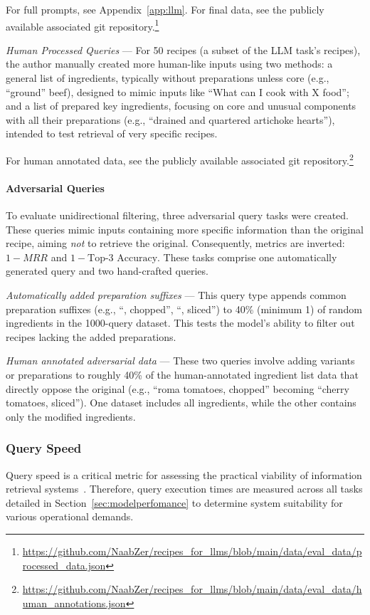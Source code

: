 \documentclass[11pt]{article}
\begin{document}
For full prompts, see Appendix~\ref{app:llm}. For final data, see the publicly
available associated git
repository.\footnote{\url{https://github.com/NaabZer/recipes_for_llms/blob/main/data/eval_data/processed_data.json}}

\emph{Human Processed Queries} --- For 50 recipes (a subset of the LLM task's
recipes), the author manually created more human-like inputs using two methods:
a general list of ingredients, typically without preparations unless core (e.g.,
``ground'' beef), designed to mimic inputs like ``What can I cook with X
food''; and a list of prepared key ingredients, focusing on core and unusual
components with all their preparations (e.g., ``drained and quartered artichoke
hearts''), intended to test retrieval of very specific recipes.

For human annotated data, see the publicly available associated git
repository.\footnote{\url{https://github.com/NaabZer/recipes_for_llms/blob/main/data/eval_data/human_annotations.json}} 

\paragraph{Adversarial Queries}
To evaluate unidirectional filtering, three adversarial query tasks were created.
These queries mimic inputs containing more specific information than the
original recipe, aiming \emph{not} to retrieve the original.
Consequently, metrics are inverted: $1-MRR$ and $1-\text{Top-3 Accuracy}$.
These tasks comprise one automatically generated query and two hand-crafted queries.

\emph{Automatically added preparation suffixes} --- This query type appends
common preparation suffixes (e.g., ``, chopped'', ``, sliced'') to 40\% (minimum
1) of random ingredients in the 1000-query dataset.
This tests the model's ability to filter out recipes lacking the added preparations.

\emph{Human annotated adversarial data} --- These two queries involve adding
variants or preparations to roughly 40\% of the human-annotated ingredient list
data that directly oppose the original (e.g., ``roma tomatoes, chopped''
becoming ``cherry tomatoes, sliced'').
One dataset includes all ingredients, while the other contains only the modified
ingredients.

\subsubsection{Query Speed}
Query speed is a critical metric for assessing the practical viability of
information retrieval systems~\cite{manning2009introduction}.
Therefore, query execution times are measured across all tasks detailed in
Section~\ref{sec:modelperfomance} to determine system suitability for various
operational demands.
\end{document}
